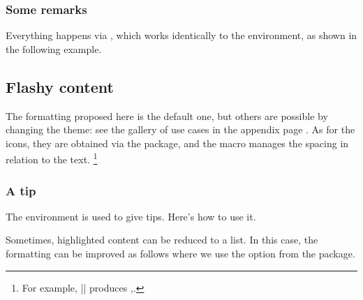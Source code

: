 



\subsubsection{Some remarks}

Everything happens via , which works identically to the  environment, as shown in the following example.




\subsection{Flashy content}
\label{tutodoc-admonitions}

\begin{tdocnote}
	The formatting proposed here is the default one, but others are possible by changing the theme: see the gallery of use cases in the appendix page \pageref{tutodoc-theme-gallery}.
	As for the icons, they are obtained via the  package, and the  macro manages the spacing in relation to the text.
	\footnote{
		For example,
		\tdocinlatex||
		produces
		,.
	}
\end{tdocnote}


\subsubsection{A tip}

The  environment is used to give tips. Here's how to use it.




\smallskip


\begin{tdoctip}
    Sometimes, highlighted content can be reduced to a list. In this case, the formatting can be improved as follows where we use the  option from the  package.


\end{tdoctip}


